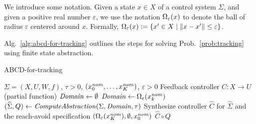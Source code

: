 We introduce some notation.
Given a state $x\in X$ of a control system $\Sigma$, and given a positive real number $\varepsilon$, we use the notation $\Omega_\varepsilon(x)$ to denote the ball of radius $\varepsilon$ centered around $x$.
Formally, $\Omega_\varepsilon(x):= \{ x'\in X\mid \| x-x' \|\leq \varepsilon \}$.

Alg.~\ref{alg:abcd-for-tracking} outlines the steps for solving Prob.~\ref{prob:tracking} using finite state abstraction.

\begin{algorithm}
	\caption{ABCD-for-tracking}
	\label{alg:abcd-for-tracking}
	\begin{algorithmic}[1]
		\Require $\Sigma=(X,U,W,f)$, $\tau>0$, $(x_0^{\mathit{nom}},\ldots,x_K^{\mathit{nom}})$, $\varepsilon>0$
		\Ensure Feedback controller $C:X\rightarrow U$ (partial function)
		\State $\mathit{Domain}\gets \emptyset$
			\State $\mathit{Domain}\gets \Omega_\varepsilon(x_k^{\mathit{nom}})$
		\EndFor
		\State $(\widehat{\Sigma},Q) \gets \mathit{ComputeAbstraction}(\Sigma, \mathit{Domain}, \tau)$
		\State Synthesize controller $\widehat{C}$ for $\widehat{\Sigma}$ and the reach-avoid specification $(\Omega_\varepsilon(x_K^{\mathit{nom}}), \emptyset, x_0^{\mathit{nom}})$
		\State \Return $\widehat{C}\circ Q$
	\end{algorithmic}
\end{algorithm}